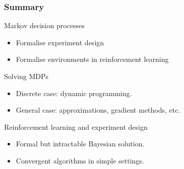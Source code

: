 \documentclass[9pt]{beamer}
\begin{document}
  \begin{frame}
    \frametitle{Summary}
    \begin{block}{Markov decision processes}
      \begin{itemize}
      \item Formalise experiment design
      \item Formalise environments in reinforcement learning
      \end{itemize}
    \end{block}
    \begin{block}{Solving MDPs}
      \begin{itemize}
      \item Discrete case: dynamic programming.
      \item General case: approximations, gradient methods, etc.
      \end{itemize}
    \end{block}
    \begin{block}{Reinforcement learning and experiment design}
      \begin{itemize}
      \item Formal but intractable Bayesian solution.
      \item Convergent algorithms in simple settings.
      \end{itemize}
    \end{block}


  \end{frame}
\end{document}
